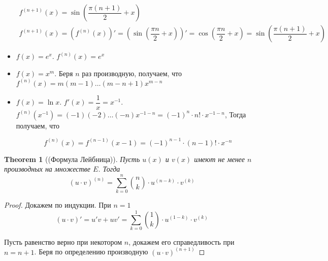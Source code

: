 \documentclass[a4paper]{article}
\theoremstyle{named}
\newtheorem*{namedtheorem}{Theorem}
\begin{document}
\begin{colloq}
\begin{itemize}
			\[\begin{gathered}
				f^{(n + 1)}(x) = \sin \left(\dfrac{\pi(n + 1)}{2} + x\right) \\
				f^{(n + 1)}(x) = (f^{(n)}(x))' = \left(\sin \left(\dfrac{\pi n}{2} + x\right)\right)' = 
				\cos \left(\dfrac{\pi n}{2} + x\right) = \sin \left(\dfrac{\pi(n + 1)}{2} + x\right)
			\end{gathered}\]

			\item
			$f(x) = e^x$. $f^{(n)}(x) = e^x$

			\item
			$f(x) = x^m$. Беря $n$ раз производную, получаем, что $f^{(n)}(x) = m(m - 1) \dots (m - n + 1)x^{m - n}$

			\item
			$f(x) = \ln x$. $f'(x) = \dfrac{1}{x} = x^{-1}$. $f^{(n)}(x^{-1}) = (-1)(-2)\dots(-n)x^{-1-n} = (-1)^n \cdot n! \cdot x^{-1 - n}$, Тогда получаем, что

			\begin{equation*}
				f^{(n)}(x) = f^{(n - 1)}(x - 1) = (-1)^{n - 1} \cdot (n - 1)! \cdot x^{-n}
			\end{equation*}
		\end{itemize}

		\begin{namedtheorem}[(Формула Лейбница)]
			Пусть $u(x)$ и $v(x)$ имеют не менее $n$ производных на множестве $E$. Тогда
			\begin{equation*}
				(u \cdot v)^{(n)} = \sum_{k = 0}^n \binom{n}{k} \cdot u^{(n - k)} \cdot v^{(k)}
			\end{equation*}
		\end{namedtheorem}

		\begin{proof}
			Докажем по индукции. При $n = 1$
			\begin{equation*}
				(u \cdot v)' = u'v + uv' = \sum_{k = 0}^1 \binom{1}{k} \cdot u^{(1 - k)} \cdot v^{(k)}
			\end{equation*}

			Пусть равенство верно при некотором $n$, докажем его справедливость при $n = n + 1$. Беря по определению производную $(u \cdot v)^{(n + 1)}$


\end{proof}
\end{colloq}
\end{document}
